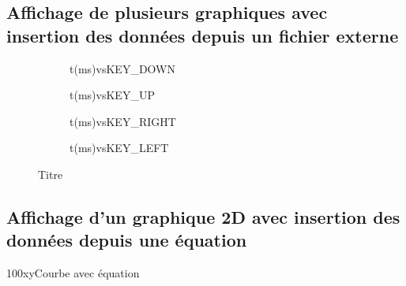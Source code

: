 \subsection{Affichage de plusieurs graphiques avec insertion des données depuis un fichier externe}

\begin{figure}
\begin{subfigure}{.5\textwidth}
  \centering
   \centering
 \begin{graphics}{0.9}{0.4}{-0.05}{20}{-1}{6}{t(ms)}{vs}{KEY\_DOWN}
\end{graphics}
\end{subfigure}
\begin{subfigure}{.5\textwidth}
  \centering
   \centering
 \begin{graphics}{0.9}{0.4}{-0.05}{80}{-1}{6}{t(ms)}{vs}{KEY\_UP}
\end{graphics}
\end{subfigure}

\begin{subfigure}{.5\textwidth}
  \centering
 \begin{graphics}{0.9}{0.4}{-0.05}{60}{-1}{6}{t(ms)}{vs}{KEY\_RIGHT}
\end{graphics}
\end{subfigure}
\begin{subfigure}{.5\textwidth}
  \centering
   \centering
 \begin{graphics}{0.9}{0.4}{-0.05}{40}{-1}{6}{t(ms)}{vs}{KEY\_LEFT}
\end{graphics}
\end{subfigure}
\caption{Titre}
\label{fig:fig}
\end{figure}

\newpage

\subsection{Affichage d'un graphique 2D avec insertion des données depuis une équation}



\begin{graphics}{0.4}{0.4}{-10}{10}{-1}{100}{x}{y}{Courbe avec équation}
\end{graphics}

